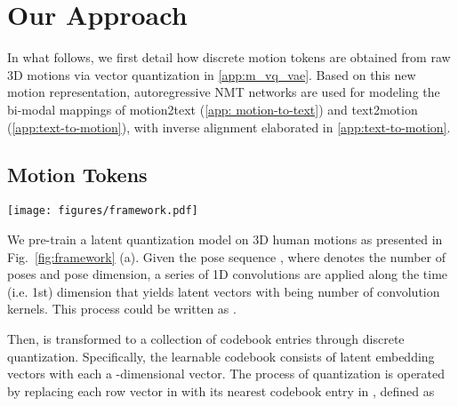 \documentclass[runningheads]{llncs}
\newcommand{\beforefigcaption}{\vspace{-9mm}}
\newcommand{\afterfigcaption}{\vspace{-5mm}}
\newcommand{\beforesection}{\vspace{-2mm}}
\newcommand{\aftersection}{\vspace{-2mm}}
\newcommand{\beforesubsection}{\vspace{-2mm}}
\newcommand{\aftersubsection}{\vspace{-2mm}}
\begin{document}
\beforesection
\section{Our Approach}
\aftersection

In what follows, we first detail how discrete motion tokens are obtained from raw 3D motions via vector quantization in \cref{app:m_vq_vae}. Based on this new motion representation, autoregressive NMT networks are used for modeling the bi-modal mappings of motion2text (\cref{app: motion-to-text}) and text2motion (\cref{app:text-to-motion}), with inverse alignment elaborated in \cref{app:text-to-motion}.

\beforesubsection
\subsection{Motion Tokens}
\aftersubsection
\label{app:m_vq_vae}

\begin{figure*}[t]
	\centering
	\texttt{[image: figures/framework.pdf]}
		 \beforefigcaption
	\caption{\textbf{Approach overview.} (a) A 1D CNN based latent quantization model is firstly learned to reconstruct training motions. After training, a motion can be subsequently converted to a tuple of discrete motion tokens (i.e., codebook-indices). [BOM] and [EOM] are indicators of start and end added in a motion token sequence. (b-c) Mappings between motion and text tokens are modeled by autoregressive NMT networks and optimized by maximizing the log-likelihood of the targets ( and ). (c) While training text2motion, motion tokens sampled from the resulting discrete distributions are inversely mapped to the text space via the learned motion2text model. Loss  penalizes the inverse alignment error. Finally, the 3D pose sequence is obtained by decoding motion tokens via the decoder  in (a).}
	\label{fig:framework}
	 \afterfigcaption
\end{figure*}

We pre-train a latent quantization model on 3D human motions as presented in Fig.~\ref{fig:framework} (a). Given the pose sequence , where  denotes the number of poses and  pose dimension, a series of 1D convolutions are applied along the time (i.e. 1st) dimension that yields latent vectors  with  being number of convolution kernels. This process could be written as . 

Then,  is transformed to a collection of codebook entries  through discrete quantization. Specifically, the learnable codebook  consists of  latent embedding vectors with each a -dimensional vector. The process of quantization  is operated by replacing each 
row vector  in  with its nearest codebook entry  in , defined as
\end{document}
